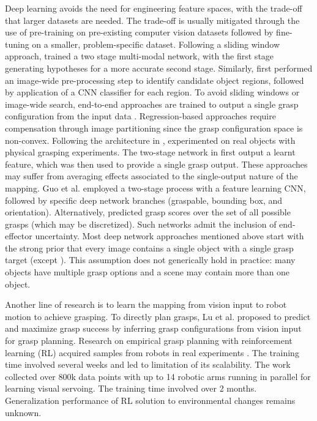 \documentclass[letterpaper, 10 pt, journal, twoside]{IEEEtran}
\begin{document}
Deep learning avoids the need for engineering feature spaces, with the
trade-off that larger datasets are needed.  The trade-off is usually
mitigated through the use of pre-training on pre-existing computer vision
datasets followed by fine-tuning on a smaller, problem-specific dataset.
Following a sliding window approach, \cite{lenz2015deep} trained a two
stage multi-modal network, with the first stage generating hypotheses for a
more accurate second stage. Similarly,
\cite{wang2016robot} first performed an image-wide pre-processing step to
identify candidate object regions, followed by application of a CNN classifier for each region.
To avoid sliding windows or image-wide search, end-to-end approaches are
trained to output a single grasp configuration from the input data
\cite{redmon2015real,kumra2016robotic,watson2017real}.
Regression-based approaches \cite{redmon2015real} require compensation
through image partitioning since the grasp configuration space is
non-convex.
Following the architecture in \cite{redmon2015real}, \cite{watson2017real} 
experimented on real objects with physical grasping experiments.
The two-stage network in \cite{kumra2016robotic} first output a learnt
feature, which was then used to provide a single grasp output. These approaches may
suffer from averaging effects associated to the single-output nature of
the mapping.  Guo et al. \cite{GuEtAl_ICRA2017} employed a two-stage
process with a feature learning CNN, followed by specific deep network
branches (graspable, bounding box, and orientation). 
Alternatively, \cite{johns2016deep, MaEtAl_RSS[2017]} predicted grasp
scores over the set of all possible grasps (which may be discretized).
Such networks admit the inclusion of end-effector uncertainty. 
Most deep network approaches mentioned above start with
the strong prior that every image contains a single object with a single
grasp target (except \cite{wang2016robot}).  This assumption does not
generically hold in practice: many objects have multiple grasp options
and a scene may contain more than one object. 

Another line of research is to learn the mapping from vision input to robot motion to achieve grasping. To directly plan grasps, Lu et al. \cite{lu2017planning} proposed to predict and maximize grasp success by inferring grasp configurations from
vision input for grasp planning. Research on empirical grasp planning 
with reinforcement learning (RL) acquired samples from robots in real
experiments \cite{pinto2016supersizing}. The training time involved
several weeks and led to limitation of its scalability.  The work 
\cite{levine2016learning} collected over 800k data points with up to 14
robotic arms running in parallel for learning visual servoing. 
The training time involved over 2 months. Generalization performance of
RL solution to environmental changes remains unknown.
\end{document}
